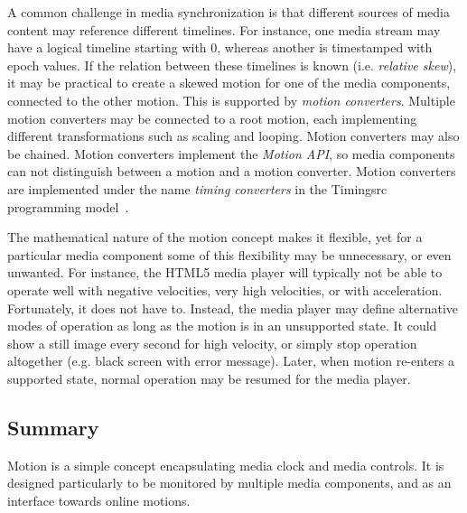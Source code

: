 
A common challenge in media synchronization is that different sources of media
content may reference different timelines. For instance, one media stream may
have a logical timeline starting with 0, whereas another is timestamped with
epoch values. If the relation between these timelines is known (i.e. \emph{relative
skew}), it may be practical to create a skewed motion for one of the media
components, connected to the other motion. This is supported by \emph{motion
converters}. Multiple motion converters may be connected to a root motion, each
implementing different transformations such as scaling and looping. Motion
converters may also be chained. Motion converters implement the \emph{Motion API},
so media components can not distinguish between a motion and a motion
converter. Motion converters are implemented under the name \emph{timing converters}
in the Timingsrc programming model~\cite{timingsrc}.


The mathematical nature of the motion concept makes it flexible, yet for a
particular media component some of this flexibility may be unnecessary, or
even unwanted. For instance, the HTML5 media player will typically not be able
to operate well with negative velocities, very high velocities, or with
acceleration. Fortunately, it does not have to. Instead, the media player may
define alternative modes of operation as long as the motion is in an
unsupported state. It could show a still image every second for high velocity,
or simply stop operation altogether (e.g. black screen with error message).
Later, when motion re-enters a supported state, normal operation may be
resumed for the media player.

\subsection {Summary}

Motion is a simple concept encapsulating media clock and media controls. It is
designed particularly to be monitored by multiple media components, and as an
interface towards online motions.
